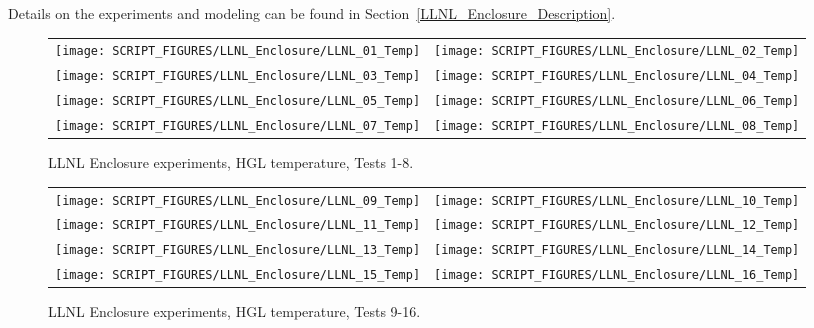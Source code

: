 Details on the experiments and modeling can be found in Section~\ref{LLNL_Enclosure_Description}.

\newpage

\begin{figure}[p]
\begin{tabular*}{\textwidth}{l@{\extracolsep{\fill}}r}
\texttt{[image: SCRIPT\_FIGURES/LLNL\_Enclosure/LLNL\_01\_Temp]} &
\texttt{[image: SCRIPT\_FIGURES/LLNL\_Enclosure/LLNL\_02\_Temp]} \\
\texttt{[image: SCRIPT\_FIGURES/LLNL\_Enclosure/LLNL\_03\_Temp]} &
\texttt{[image: SCRIPT\_FIGURES/LLNL\_Enclosure/LLNL\_04\_Temp]} \\
\texttt{[image: SCRIPT\_FIGURES/LLNL\_Enclosure/LLNL\_05\_Temp]} &
\texttt{[image: SCRIPT\_FIGURES/LLNL\_Enclosure/LLNL\_06\_Temp]} \\
\texttt{[image: SCRIPT\_FIGURES/LLNL\_Enclosure/LLNL\_07\_Temp]} &
\texttt{[image: SCRIPT\_FIGURES/LLNL\_Enclosure/LLNL\_08\_Temp]}
\end{tabular*}
\caption[LLNL Enclosure experiments, HGL temperature, Tests 1-8]
{LLNL Enclosure experiments, HGL temperature, Tests 1-8.}
\label{LLNL_Enclosure_Temp_1}
\end{figure}

\begin{figure}[p]
\begin{tabular*}{\textwidth}{l@{\extracolsep{\fill}}r}
\texttt{[image: SCRIPT\_FIGURES/LLNL\_Enclosure/LLNL\_09\_Temp]} &
\texttt{[image: SCRIPT\_FIGURES/LLNL\_Enclosure/LLNL\_10\_Temp]} \\
\texttt{[image: SCRIPT\_FIGURES/LLNL\_Enclosure/LLNL\_11\_Temp]} &
\texttt{[image: SCRIPT\_FIGURES/LLNL\_Enclosure/LLNL\_12\_Temp]} \\
\texttt{[image: SCRIPT\_FIGURES/LLNL\_Enclosure/LLNL\_13\_Temp]} &
\texttt{[image: SCRIPT\_FIGURES/LLNL\_Enclosure/LLNL\_14\_Temp]} \\
\texttt{[image: SCRIPT\_FIGURES/LLNL\_Enclosure/LLNL\_15\_Temp]} &
\texttt{[image: SCRIPT\_FIGURES/LLNL\_Enclosure/LLNL\_16\_Temp]}
\end{tabular*}
\caption[LLNL Enclosure experiments, HGL temperature, Tests 9-16]
{LLNL Enclosure experiments, HGL temperature, Tests 9-16.}
\label{LLNL_Enclosure_Temp_2}
\end{figure}

